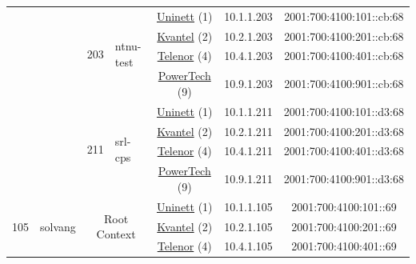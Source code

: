 \begin{small}
\begin{center}
\begin{longtable}{|c|c|c|c|c|c|c|c|}
  &  & \multirow{4}{*}{\tiny{203}} & \multicolumn{1}{|l|}{\multirow{4}{*}{\tiny{ntnu-test}}} & \multicolumn{2}{|c|}{\tiny{\href{https://www.uninett.no}{Uninett} (1)}} & \tiny{10.1.1.203} & \tiny{2001:700:4100:101::cb:68} \\* \cline{5-5}\cline{6-6}\cline{7-7}\cline{8-8}
  &  &  &  & \multicolumn{2}{|c|}{\tiny{\href{http://kvantel.no}{Kvantel} (2)}} & \tiny{10.2.1.203} & \tiny{2001:700:4100:201::cb:68} \\* \cline{5-5}\cline{6-6}\cline{7-7}\cline{8-8}
  &  &  &  & \multicolumn{2}{|c|}{\tiny{\href{https://www.telenor.no}{Telenor} (4)}} & \tiny{10.4.1.203} & \tiny{2001:700:4100:401::cb:68} \\* \cline{5-5}\cline{6-6}\cline{7-7}\cline{8-8}
  &  &  &  & \multicolumn{2}{|c|}{\tiny{\href{http://www.powertech.no}{PowerTech} (9)}} & \tiny{10.9.1.203} & \tiny{2001:700:4100:901::cb:68} \\* \cline{3-3}\cline{4-4}\cline{5-5}\cline{6-6}\cline{7-7}\cline{8-8}
  &  & \multirow{4}{*}{\tiny{211}} & \multicolumn{1}{|l|}{\multirow{4}{*}{\tiny{srl-cps}}} & \multicolumn{2}{|c|}{\tiny{\href{https://www.uninett.no}{Uninett} (1)}} & \tiny{10.1.1.211} & \tiny{2001:700:4100:101::d3:68} \\* \cline{5-5}\cline{6-6}\cline{7-7}\cline{8-8}
  &  &  &  & \multicolumn{2}{|c|}{\tiny{\href{http://kvantel.no}{Kvantel} (2)}} & \tiny{10.2.1.211} & \tiny{2001:700:4100:201::d3:68} \\* \cline{5-5}\cline{6-6}\cline{7-7}\cline{8-8}
  &  &  &  & \multicolumn{2}{|c|}{\tiny{\href{https://www.telenor.no}{Telenor} (4)}} & \tiny{10.4.1.211} & \tiny{2001:700:4100:401::d3:68} \\* \cline{5-5}\cline{6-6}\cline{7-7}\cline{8-8}
  &  &  &  & \multicolumn{2}{|c|}{\tiny{\href{http://www.powertech.no}{PowerTech} (9)}} & \tiny{10.9.1.211} & \tiny{2001:700:4100:901::d3:68} \\ \hline
 \multirow{52}{*}{\tiny{105}} & \multicolumn{1}{|l|}{\multirow{52}{*}{\tiny{solvang}}} & \multicolumn{2}{|c|}{\multirow{4}{*}{\tiny{Root Context}}} & \multicolumn{2}{|c|}{\tiny{\href{https://www.uninett.no}{Uninett} (1)}} & \tiny{10.1.1.105} & \tiny{2001:700:4100:101::69} \\* \cline{5-5}\cline{6-6}\cline{7-7}\cline{8-8}
  &  & \multicolumn{2}{|c|}{} & \multicolumn{2}{|c|}{\tiny{\href{http://kvantel.no}{Kvantel} (2)}} & \tiny{10.2.1.105} & \tiny{2001:700:4100:201::69} \\* \cline{5-5}\cline{6-6}\cline{7-7}\cline{8-8}
  &  & \multicolumn{2}{|c|}{} & \multicolumn{2}{|c|}{\tiny{\href{https://www.telenor.no}{Telenor} (4)}} & \tiny{10.4.1.105} & \tiny{2001:700:4100:401::69} \\* \cline{5-5}\cline{6-6}\cline{7-7}\cline{8-8}

\end{longtable}
\end{center}
\end{small}
